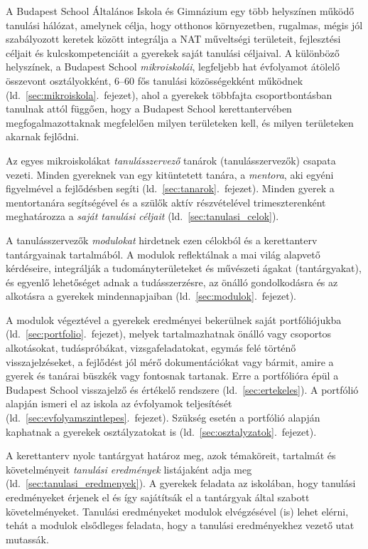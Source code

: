 A Budapest School Általános Iskola és Gimnázium egy több helyszínen működő tanulási hálózat, amelynek célja, hogy otthonos környezetben, rugalmas, mégis jól szabályozott keretek között integrálja a NAT műveltségi területeit, fejlesztési céljait és kulcskompetenciáit a gyerekek saját tanulási céljaival. A különböző helyszínek, a Budapest School \emph{mikroiskolái}, legfeljebb hat évfolyamot átölelő összevont osztályokként, 6--60 fős tanulási közösségekként működnek (ld.~\ref{sec:mikroiskola}.~fejezet), ahol a gyerekek többfajta csoportbontásban tanulnak attól függően, hogy a Budapest School kerettantervében megfogalmazottaknak megfelelően milyen területeken kell, és milyen területeken akarnak fejlődni.

Az egyes mikroiskolákat \emph{tanulásszervező} tanárok (tanulásszervezők) csapata vezeti. Minden gyereknek van egy kitüntetett tanára, a \emph{mentora}, aki egyéni figyelmével a fejlődésben segíti (ld.~\ref{sec:tanarok}.~fejezet). Minden gyerek a mentortanára segítségével és a szülők aktív részvételével trimeszterenként meghatározza a \emph{saját tanulási céljait}
(ld.~\ref{sec:tanulasi_celok}).

A tanulásszervezők \emph{modulokat} hirdetnek ezen célokból és a kerettanterv tantárgyainak tartalmából. A modulok reflektálnak a mai világ alapvető kérdéseire, integrálják	a tudományterületeket és művészeti ágakat (tantárgyakat), és egyenlő lehetőséget adnak a tudásszerzésre, az önálló gondolkodásra és az alkotásra a gyerekek mindennapjaiban 
(ld.~\ref{sec:modulok}.~fejezet).

A modulok végeztével a gyerekek eredményei bekerülnek saját portfóliójukba (ld.~\ref{sec:portfolio}.~fejezet), melyek tartalmazhatnak önálló vagy csoportos alkotásokat, tudáspróbákat, vizsgafeladatokat, egymás felé történő visszajelzéseket, a fejlődést jól mérő dokumentációkat vagy bármit, amire a gyerek és tanárai büszkék vagy fontosnak tartanak. Erre a portfólióra épül a Budapest School visszajelző és értékelő rendszere (ld.~\ref{sec:ertekeles}). A portfólió alapján ismeri el az iskola az évfolyamok teljesítését (ld.~\ref{sec:evfolyamszintlepes}.~fejezet). Szükség esetén a portfólió alapján kaphatnak a gyerekek osztályzatokat is (ld.~\ref{sec:osztalyzatok}.~fejezet).

A kerettanterv nyolc tantárgyat határoz meg, azok témaköreit, tartalmát és követelményeit \emph{tanulási eredmények} listájaként adja meg (ld.~\ref{sec:tanulasi_eredmenyek}). A gyerekek feladata az iskolában, hogy tanulási eredményeket érjenek el és így sajátítsák el a tantárgyak által szabott követelményeket. Tanulási eredményeket modulok elvégzésével (is) lehet elérni, tehát a modulok elsődleges feladata, hogy a tanulási eredményekhez vezető utat mutassák.

